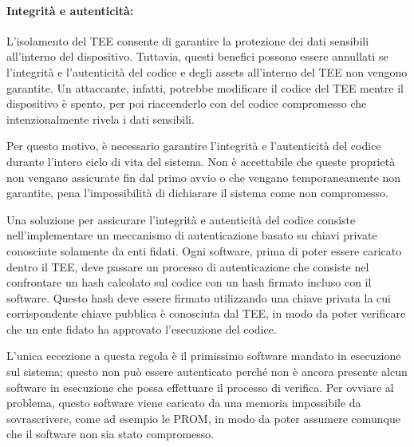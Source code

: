 \documentclass[12pt,italian]{report}
\begin{document}

\paragraph{Integrità e autenticità:}
L'isolamento del TEE consente di garantire la protezione dei dati sensibili
all'interno del dispositivo.
Tuttavia, questi benefici possono essere annullati se l'integrità e
l'autenticità del codice e degli assets all'interno del TEE non vengono
garantite.
Un attaccante, infatti, potrebbe modificare il codice del TEE mentre il
dispositivo è spento, per poi riaccenderlo con del codice compromesso
che intenzionalmente rivela i dati sensibili.

Per questo motivo, è necessario garantire l'integrità e l'autenticità del
codice durante l'intero ciclo di vita del sistema.
Non è accettabile che queste proprietà non vengano assicurate fin dal primo
avvio o che vengano temporaneamente non garantite, pena l'impossibilità di
dichiarare il sistema come non compromesso.

Una soluzione per assicurare l'integrità e autenticità del codice consiste
nell'implementare un meccanismo di autenticazione basato su chiavi
private conosciute solamente da enti fidati.
Ogni software, prima di poter essere caricato dentro il TEE, deve
passare un processo di autenticazione che consiste nel confrontare un hash
calcolato sul codice con un hash firmato incluso con il software.
Questo hash deve essere firmato utilizzando una chiave privata la cui
corrispondente chiave pubblica è conosciuta dal TEE, in modo da poter
verificare che un ente fidato ha approvato l'esecuzione del codice.

L'unica eccezione a questa regola è il primissimo software mandato
in esecuzione sul sistema; questo non può essere autenticato perché non
è ancora presente alcun software in esecuzione che possa effettuare il
processo di verifica.
Per ovviare al problema, questo software viene caricato da una memoria
impossibile da sovrascrivere, come ad esempio le PROM, in modo da
poter assumere comunque che il software non sia stato compromesso.
\end{document}
